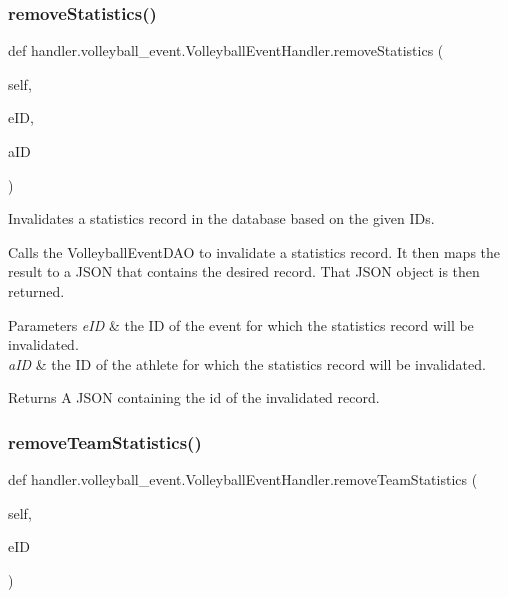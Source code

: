 \subsubsection{\texorpdfstring{remove\+Statistics()}{removeStatistics()}}
{\footnotesize\ttfamily def handler.\+volleyball\+\_\+event.\+Volleyball\+Event\+Handler.\+remove\+Statistics (\begin{DoxyParamCaption}\item[{}]{self,  }\item[{}]{e\+ID,  }\item[{}]{a\+ID }\end{DoxyParamCaption})}



Invalidates a statistics record in the database based on the given I\+Ds. 

Calls the Volleyball\+Event\+D\+AO to invalidate a statistics record. It then maps the result to a J\+S\+ON that contains the desired record. That J\+S\+ON object is then returned.


\begin{DoxyParams}{Parameters}
{\em e\+ID} & the ID of the event for which the statistics record will be invalidated. \\
\hline
{\em a\+ID} & the ID of the athlete for which the statistics record will be invalidated.\\
\hline
\end{DoxyParams}
\begin{DoxyReturn}{Returns}
A J\+S\+ON containing the id of the invalidated record. 
\end{DoxyReturn}
\mbox{\label{classhandler_1_1volleyball__event_1_1_volleyball_event_handler_a2212d7eb1e37729e936fb6c228b06b83}} 
\subsubsection{\texorpdfstring{remove\+Team\+Statistics()}{removeTeamStatistics()}}
{\footnotesize\ttfamily def handler.\+volleyball\+\_\+event.\+Volleyball\+Event\+Handler.\+remove\+Team\+Statistics (\begin{DoxyParamCaption}\item[{}]{self,  }\item[{}]{e\+ID }\end{DoxyParamCaption})}




